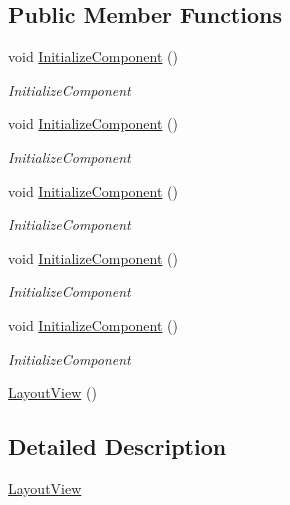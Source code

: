 \subsection*{Public Member Functions}
\begin{DoxyCompactItemize}
\item 
void \mbox{\hyperlink{class_easy_library_application_1_1_w_p_f_1_1_view_1_1_layout_view_a9b55b16f3afb60908bdc7b1db1879f76}{Initialize\+Component}} ()
\begin{DoxyCompactList}\small\item\em Initialize\+Component \end{DoxyCompactList}\item 
void \mbox{\hyperlink{class_easy_library_application_1_1_w_p_f_1_1_view_1_1_layout_view_a9b55b16f3afb60908bdc7b1db1879f76}{Initialize\+Component}} ()
\begin{DoxyCompactList}\small\item\em Initialize\+Component \end{DoxyCompactList}\item 
void \mbox{\hyperlink{class_easy_library_application_1_1_w_p_f_1_1_view_1_1_layout_view_a9b55b16f3afb60908bdc7b1db1879f76}{Initialize\+Component}} ()
\begin{DoxyCompactList}\small\item\em Initialize\+Component \end{DoxyCompactList}\item 
void \mbox{\hyperlink{class_easy_library_application_1_1_w_p_f_1_1_view_1_1_layout_view_a9b55b16f3afb60908bdc7b1db1879f76}{Initialize\+Component}} ()
\begin{DoxyCompactList}\small\item\em Initialize\+Component \end{DoxyCompactList}\item 
void \mbox{\hyperlink{class_easy_library_application_1_1_w_p_f_1_1_view_1_1_layout_view_a9b55b16f3afb60908bdc7b1db1879f76}{Initialize\+Component}} ()
\begin{DoxyCompactList}\small\item\em Initialize\+Component \end{DoxyCompactList}\item 
\mbox{\hyperlink{class_easy_library_application_1_1_w_p_f_1_1_view_1_1_layout_view_aa6affe919a157f6506f510b9c98d035f}{Layout\+View}} ()
\end{DoxyCompactItemize}


\subsection{Detailed Description}
\mbox{\hyperlink{class_easy_library_application_1_1_w_p_f_1_1_view_1_1_layout_view}{Layout\+View}} 

